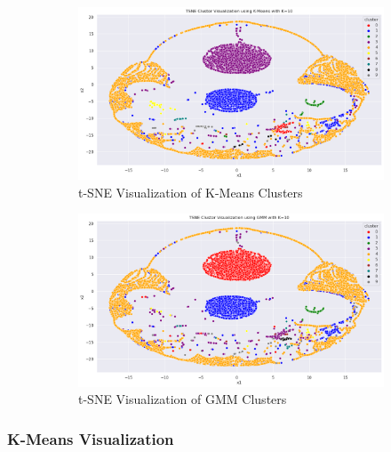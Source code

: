         \begin{figure}[H]
            \centering
            \begin{subfigure}[c]{0.47\textwidth}
                \centering
                \includegraphics[width=\textwidth]{../figures/plots/section3/tsne_kmeans_clusters.png}
                \caption{t-SNE Visualization of K-Means Clusters}
                \label{fig:tsne_kmeans}
            \end{subfigure}
            \hfill
            \begin{subfigure}[c]{0.47\textwidth}
                \centering
                \includegraphics[width=\textwidth]{../figures/plots/section3/tsne_gmm_clusters.png}
                \caption{t-SNE Visualization of GMM Clusters}
                \label{fig:tsne_gmm}
            \end{subfigure}
            \vspace{-0.1cm}
            \caption{}
            \label{fig:}
        \end{figure}

        \subsubsection{K-Means Visualization \\}

